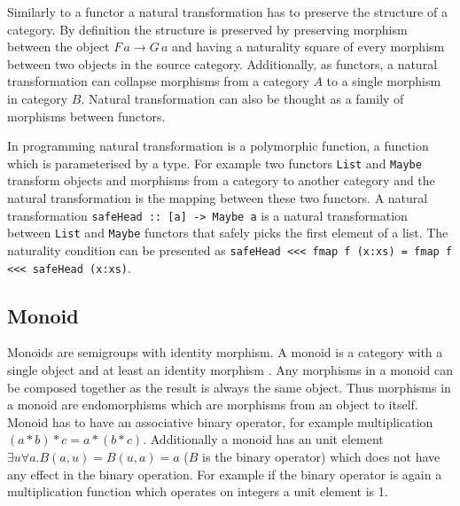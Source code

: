\documentclass[article]{aaltoseries}
\begin{document}
    Similarly to a functor a natural transformation has to preserve the
    structure of a category. By definition the structure is preserved by
    preserving morphism between the object $F\, a \rightarrow G\, a$ and having a
    naturality square of every morphism between two objects in the source
    category. Additionally, as functors, a natural transformation can collapse
    morphisms from a category $A$ to a single morphism in category $B$. Natural
    transformation can also be thought as a family of morphisms between functors.
 
    In programming natural transformation is a polymorphic function, a function
    which is parameterised by a type. For example two functors \lstinline|List|
    and \lstinline|Maybe| transform objects and morphisms from a category to
    another category and the natural transformation is the mapping between these
    two functors. A natural transformation
    \lstinline|safeHead :: [a] -> Maybe a| is a natural transformation between
    \lstinline|List| and \lstinline|Maybe| functors that safely picks the first
    element of a list. The naturality condition can be presented as
    \lstinline|safeHead <<< fmap f (x:xs) = fmap f <<< safeHead (x:xs)|.

    
  \subsection{Monoid}
    Monoids are semigroups with identity morphism. A monoid is a category with a
    single object and at least an identity morphism \cite{barr1990category,
      awodey2006category, mac2013categories, yorgey2012monoids}. Any morphisms
    in a monoid can be composed together as the result is always the same
    object. Thus morphisms in a monoid are endomorphisms which are morphisms
    from an object to itself. Monoid has to have an associative binary operator,
    for example multiplication $(a * b) * c = a * (b * c)$. Additionally a
    monoid has an unit element $\exists u \forall a. B(a,u) = B(u,a) = a$ ($B$ is
    the binary operator) which does not have any effect in the binary operation.
    For example if the binary operator is again a multiplication function which
    operates on integers a unit element is 1.

\end{document}
